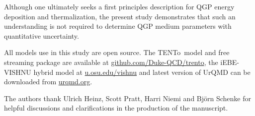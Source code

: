 \documentclass[aps,prc,reprint,amsmath,nofootinbib,superscriptaddress]{revtex4-1}
\newcommand{\trento}{T\raisebox{-0.5ex}{R}ENTo}
\begin{document}
Although one ultimately seeks a first principles description for QGP energy deposition and thermalization, the present study demonstrates that such an understanding is not required to determine QGP medium parameters with quantitative uncertainty. 
\medskip

All models use in this study are open source. The \trento\ model and free streaming package are available at \url{github.com/Duke-QCD/trento}, the iEBE-VISHNU hybrid model at \url{u.osu.edu/vishnu} and latest version of UrQMD can be downloaded from \url{urqmd.org}.

\begin{acknowledgments}
The authors thank Ulrich Heinz, Scott Pratt, Harri Niemi and Bj\"orn Schenke for helpful discussions and clarifications in the production of the manuscript.
\end{acknowledgments}


\end{document}
